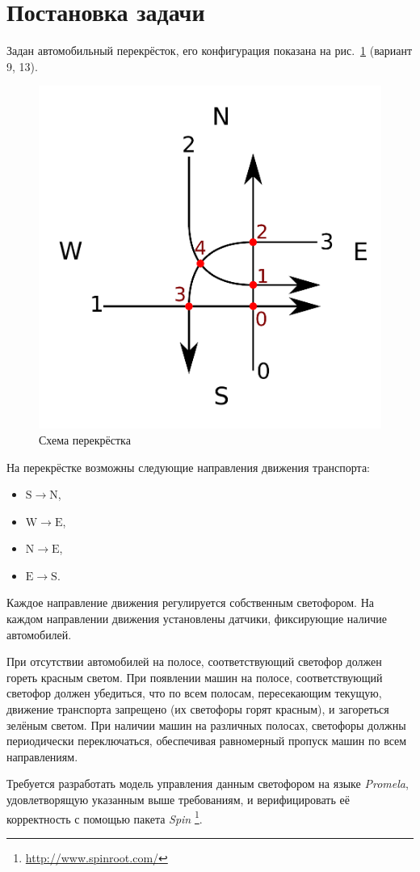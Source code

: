 \documentclass[a4paper,10pt]{article}
\begin{document}


\tableofcontents
\pagebreak


\section{Постановка задачи}
Задан автомобильный перекрёсток, его конфигурация показана на рис.~\ref{fig:crossroad} (вариант 9, 13).
\begin{figure}[h!]
  \centering
  \includegraphics[width=0.5\linewidth]{./data/crossroad.pdf}
  \caption{Схема перекрёстка}
  \label{fig:crossroad}
\end{figure}
На перекрёстке возможны следующие направления движения транспорта:
\begin{itemize}
  \item $\mathrm{S} \rightarrow \mathrm{N}$,
  \item $\mathrm{W} \rightarrow \mathrm{E}$,
  \item $\mathrm{N} \rightarrow \mathrm{E}$,
  \item $\mathrm{E} \rightarrow \mathrm{S}$.
\end{itemize}
Каждое направление движения регулируется собственным светофором.
На каждом направлении движения установлены датчики, фиксирующие наличие автомобилей.

При отсутствии автомобилей на полосе, соответствующий светофор должен гореть красным светом.
При появлении машин на полосе, соответствующий светофор должен убедиться, 
что по всем полосам, пересекающим текущую, движение транспорта запрещено 
(их светофоры горят красным), и загореться зелёным светом.
При наличии машин на различных полосах, светофоры должны периодически переключаться, 
обеспечивая равномерный пропуск машин по всем направлениям.

Требуется разработать модель управления данным светофором на языке \textit{Promela}, 
удовлетворящую указанным выше требованиям, 
и верифицировать её корректность с помощью пакета \textit{Spin}%
\footnote{\url{http://www.spinroot.com/}}.
\end{document}
